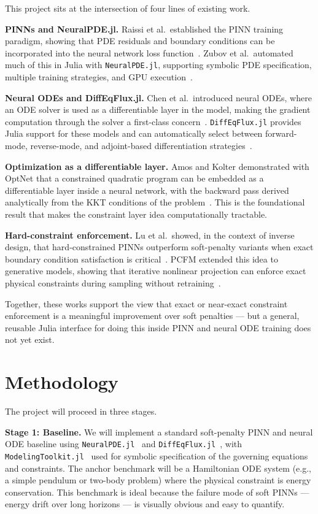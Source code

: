 \documentclass[12pt]{extarticle}
\begin{document}
This project sits at the intersection of four lines of existing work.

\textbf{PINNs and NeuralPDE.jl.}
Raissi et al.\ established the PINN training paradigm, showing that PDE
residuals and boundary conditions can be incorporated into the neural network
loss function~\cite{raissi2019}. Zubov et al.\ automated much of this in
Julia with \texttt{NeuralPDE.jl}, supporting symbolic PDE specification,
multiple training strategies, and GPU execution~\cite{zubov2021}.

\textbf{Neural ODEs and DiffEqFlux.jl.}
Chen et al.\ introduced neural ODEs, where an ODE solver is used as a
differentiable layer in the model, making the gradient computation through
the solver a first-class concern~\cite{chen2018}. \texttt{DiffEqFlux.jl}
provides Julia support for these models and can automatically select between
forward-mode, reverse-mode, and adjoint-based differentiation
strategies~\cite{rackauckas2019}.

\textbf{Optimization as a differentiable layer.}
Amos and Kolter demonstrated with OptNet that a constrained quadratic program
can be embedded as a differentiable layer inside a neural network, with the
backward pass derived analytically from the KKT conditions of the
problem~\cite{amos2017}. This is the foundational result that makes the
constraint layer idea computationally tractable.

\textbf{Hard-constraint enforcement.}
Lu et al.\ showed, in the context of inverse design, that hard-constrained
PINNs outperform soft-penalty variants when exact boundary condition
satisfaction is critical~\cite{lu2021}. PCFM extended this idea to
generative models, showing that iterative nonlinear projection can enforce
exact physical constraints during sampling without retraining~\cite{utkarsh2025}.

Together, these works support the view that exact or near-exact constraint
enforcement is a meaningful improvement over soft penalties --- but a general,
reusable Julia interface for doing this inside PINN and neural ODE training
does not yet exist.

\section*{Methodology}

The project will proceed in three stages.

\textbf{Stage 1: Baseline.}
We will implement a standard soft-penalty PINN and neural ODE baseline using
\texttt{NeuralPDE.jl}~\cite{zubov2021} and \texttt{DiffEqFlux.jl}~\cite{rackauckas2019},
with \texttt{ModelingToolkit.jl}~\cite{rackauckas2022} used for symbolic
specification of the governing equations and constraints.
The anchor benchmark will be a Hamiltonian ODE system (e.g., a simple
pendulum or two-body problem) where the physical constraint is energy
conservation. This benchmark is ideal because the failure mode of soft
PINNs --- energy drift over long horizons --- is visually obvious and easy to
quantify.
\end{document}
